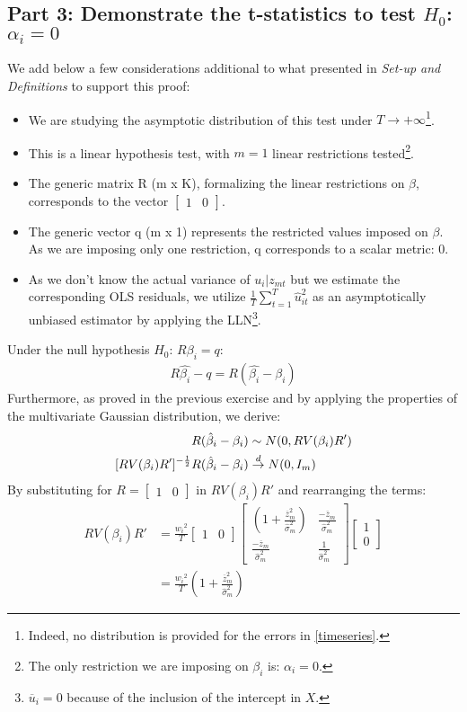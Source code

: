 \documentclass[12pt]{article}
\begin{document}
\subsection{Part 3: Demonstrate the t-statistics to test $H_0$: $\alpha_i = 0 $}
We add below a few considerations additional to what presented in \textit{Set-up and Definitions} to support this proof:
\begin{itemize}
\item We are studying the asymptotic distribution of this test under $T \to +\infty$\footnote{Indeed, no distribution is provided for the errors in \ref{timeseries}.}.	
\item This is a linear hypothesis test, with $m = 1$ linear restrictions tested\footnote{The only restriction we are imposing on $\beta_i$ is: $\alpha_i = 0 $.}.
\item The generic matrix R (m x K), formalizing the linear restrictions on $\beta$, corresponds to the vector $\begin{bmatrix} 1 & 0 \end{bmatrix}$.
\item The generic vector q (m x 1) represents the restricted values imposed on $\beta$. As we are imposing only one restriction, q corresponds to a scalar metric: 0.
\item As we don't know the actual variance of $u_i|z_{mt}$ but we estimate the corresponding OLS residuals, we utilize $\frac{1}{T}\sum_{t=1}^{T}\hat{u}_{it}^2$ as an asymptotically unbiased estimator by applying the LLN\footnote{$\overline{u}_i = 0$ because of the inclusion of the intercept in $X$.}.
\end{itemize}
Under the null hypothesis $H_0$: $R\beta_i=q$:
\begin{align*}
R\hat{\beta_i}-q = R(\hat{\beta_i} - \beta_i)
\end{align*}
Furthermore, as proved in the previous exercise and by applying the properties of the multivariate Gaussian distribution, we derive:
\begin{align} \label{2.3}
R(\hat{\beta}_i-\beta_i) &\sim N(0, RV(\beta_i)R') \notag \\
[RV(\beta_i)R']^{-\frac{1}{2}}R(\hat{\beta}_i-\beta_i) &\overset{d}{\to} N(0,I_m)
\end{align}
By substituting for $R=\begin{bmatrix} 1 & 0 \end{bmatrix}$ in $RV(\beta_i)R'$ and rearranging the terms:
\begin{align*}
RV(\beta_i)R' &= \frac{w_i{^2}}{T} \begin{bmatrix} 1 & 0 \end{bmatrix} \begin{bmatrix} (1 + \frac{\overline{z}_m^2}{\hat{\sigma}_{m}^2}) & \frac{-\overline{z}_m}{\hat{\sigma}_{m}^2} \\ \frac{-\overline{z}_m}{\hat{\sigma}_{m}^2} & \frac{1}{\hat{\sigma}_{m}^2} \end{bmatrix} \begin{bmatrix} 1 \\ 0 \end{bmatrix} \\
&= \frac{w_i{^2}}{T}(1 + \frac{\overline{z}_m^2}{\hat{\sigma}_{m}^2})
\end{align*}
\end{document}
